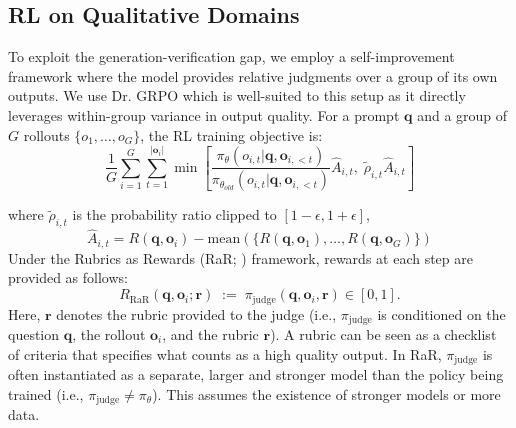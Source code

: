 \documentclass{article}
\theoremstyle{plain}
\theoremstyle{definition}
\theoremstyle{remark}
\begin{document}
\subsection{RL on Qualitative Domains}


To exploit the generation-verification gap, we employ a self-improvement framework where the model provides relative judgments over a group of its own outputs. We use Dr. GRPO \citep{liu2025understandingr1zeroliketrainingcritical} which is well-suited to this setup as it directly leverages within-group variance in output quality. For a prompt $\mathbf{q}$ and a group of $G$ rollouts $\{o_1, \ldots, o_G\}$, the RL training objective is:
$$\frac{1}{G} \sum_{i=1}^{G} \sum_{t=1}^{|\mathbf{o}_i|} \min \left[ \frac{\pi_\theta(o_{i,t} | \mathbf{q}, \mathbf{o}_{i,<t})}{\pi_{\theta_{old}}(o_{i,t} | \mathbf{q}, \mathbf{o}_{i,<t})} \hat{A}_{i,t}, \; \tilde{\rho}_{i,t} \hat{A}_{i,t} \right]$$

where $\tilde{\rho}_{i,t}$ is the probability ratio clipped to $[1-\epsilon, 1+\epsilon]$,
$$\hat{A}_{i,t} = R(\mathbf{q}, \mathbf{o}_i) - \text{mean}\left(\{R(\mathbf{q}, \mathbf{o}_1), \ldots, R(\mathbf{q}, \mathbf{o}_G)\}\right)$$
Under the Rubrics as Rewards (RaR; \citep{gunjal2025rubricsrewardsreinforcementlearning}) framework, rewards at each step are provided as follows:
$$
R_{\mathrm{RaR}}(\mathbf{q}, \mathbf{o}_i; \mathbf{r})
\;:=\;
\pi_{\mathrm{judge}}\!\left(\mathbf{q}, \mathbf{o}_i, \mathbf{r}\right)
\in [0,1].
$$
Here, $\mathbf{r}$ denotes the rubric provided to the judge (i.e., $\pi_{\mathrm{judge}}$ is conditioned on the question $\mathbf{q}$, the rollout $\mathbf{o}_i$, and the rubric $\mathbf{r}$). A rubric can be seen as a checklist of criteria that specifies what counts as a high quality output. In RaR, $\pi_{\mathrm{judge}}$ is often instantiated as a separate, larger and stronger model than the policy being trained (i.e., $\pi_{\mathrm{judge}} \neq \pi_\theta$). This assumes the existence of stronger models or more data.
\end{document}
